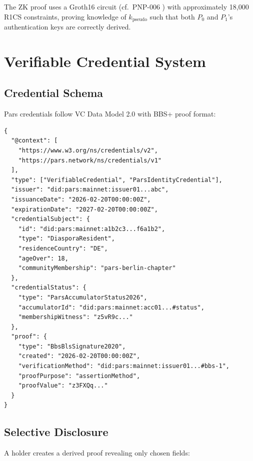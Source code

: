 \documentclass[11pt,a4paper]{article}
\begin{document}
The ZK proof uses a Groth16 circuit (cf.\ PNP-006 \cite{pnp006}) with approximately
18{,}000 R1CS constraints, proving knowledge of $k_{\text{pseudo}}$ such that both
$P_0$ and $P_1$'s authentication keys are correctly derived.

\section{Verifiable Credential System}
\label{sec:credentials}

\subsection{Credential Schema}

Pars credentials follow VC Data Model 2.0 \cite{w3c-vc-dm} with BBS+ proof format:

\begin{lstlisting}[language={},caption={Pars Verifiable Credential example}]
{
  "@context": [
    "https://www.w3.org/ns/credentials/v2",
    "https://pars.network/ns/credentials/v1"
  ],
  "type": ["VerifiableCredential", "ParsIdentityCredential"],
  "issuer": "did:pars:mainnet:issuer01...abc",
  "issuanceDate": "2026-02-20T00:00:00Z",
  "expirationDate": "2027-02-20T00:00:00Z",
  "credentialSubject": {
    "id": "did:pars:mainnet:a1b2c3...f6a1b2",
    "type": "DiasporaResident",
    "residenceCountry": "DE",
    "ageOver": 18,
    "communityMembership": "pars-berlin-chapter"
  },
  "credentialStatus": {
    "type": "ParsAccumulatorStatus2026",
    "accumulatorId": "did:pars:mainnet:acc01...#status",
    "membershipWitness": "z5vR9c..."
  },
  "proof": {
    "type": "BbsBlsSignature2020",
    "created": "2026-02-20T00:00:00Z",
    "verificationMethod": "did:pars:mainnet:issuer01...#bbs-1",
    "proofPurpose": "assertionMethod",
    "proofValue": "z3FXQq..."
  }
}
\end{lstlisting}

\subsection{Selective Disclosure}

A holder creates a derived proof revealing only chosen fields:
\end{document}
